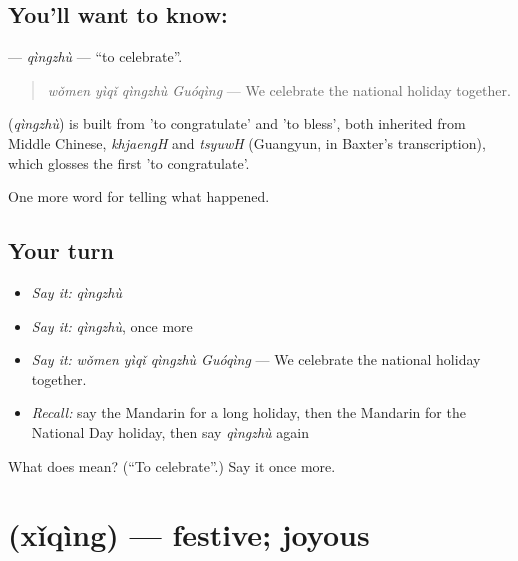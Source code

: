\subsection*{You'll want to know: }
\textbf{} — \emph{qìngzhù} — \textquotedblleft{}to celebrate\textquotedblright{}.

\begin{quote}
\textbf{} \emph{wǒmen yìqǐ qìngzhù Guóqìng} — We celebrate the national holiday together.
\end{quote}

\begin{cousinweb}
\textbf{} (\emph{qìngzhù}) is built from  'to congratulate' and  'to bless', both inherited from Middle Chinese, \emph{khjaengH} and \emph{tsyuwH} (Guangyun, in Baxter's transcription), which glosses the first 'to congratulate'.
\end{cousinweb}

\begin{grammarlens}[title={What you've built}]
One more word for telling what happened.
\end{grammarlens}

\subsection*{Your turn}
\begin{itemize}
\raggedright
  \item \emph{Say it:} \emph{qìngzhù}
  \item \emph{Say it:} \emph{qìngzhù}, once more
  \item \emph{Say it:} \emph{wǒmen yìqǐ qìngzhù Guóqìng} — We celebrate the national holiday together.
  \item \emph{Recall:} say the Mandarin for a long holiday, then the Mandarin for the National Day holiday, then say \emph{qìngzhù} again
\end{itemize}

\begin{tcolorbox}[breakable,colback=teal!4,colframe=teal!35!black,title={Before you move on}]
What does  mean? (\textquotedblleft{}To celebrate\textquotedblright{}.) Say it once more.
\end{tcolorbox}
\section[\texorpdfstring{\zh{喜庆} (xǐqìng)}{喜庆 (xǐqìng)}]{ (xǐqìng) — festive; joyous}

